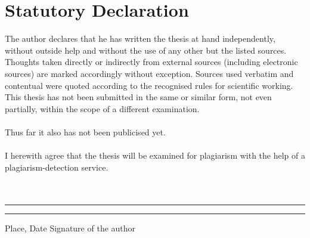 \documentclass[a4paper, 11pt, twoside]{article}
\begin{document}
\section*{Statutory Declaration}
\thispagestyle{empty}
The author declares that he has written the thesis at hand independently, without outside help and without the use of any other but the listed sources. Thoughts taken directly or indirectly from external sources (including electronic sources) are marked accordingly without exception. Sources used verbatim and contentual were quoted according to the recognised rules for scientific working. This thesis has not been submitted in the same or similar form, not even partially, within the scope of a different examination.\\\\
Thus far it also has not been publicised yet.\\\\
I herewith agree that the thesis will be examined for plagiarism with the help of a plagiarism-detection service.\\\\\\
\noindent\rule{5cm}{.4pt}\hfill\rule{5cm}{.4pt}\par
\noindent Place, Date \hfill Signature of the author
\end{document}
